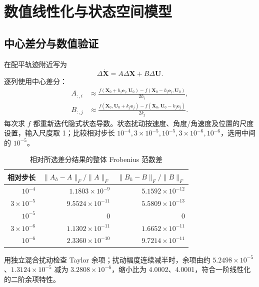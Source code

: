 \documentclass[UTF8,a4paper,11pt,fontset=windows]{ctexart}
\begin{document}
\section{数值线性化与状态空间模型}
\subsection{中心差分与数值验证}
在配平轨迹附近写为
\begin{equation}\label{eq:ss}
\Delta\dot{\bm X}=A\Delta\bm X+B\Delta\bm U.
\end{equation}
逐列使用中心差分：
\begin{align}
A_{:,i}&\approx\frac{f(\bm X_0+h_i\bm e_i,\bm U_0)-f(\bm X_0-h_i\bm e_i,\bm U_0)}{2h_i},\\
B_{:,j}&\approx\frac{f(\bm X_0,\bm U_0+k_j\bm e_j)-f(\bm X_0,\bm U_0-k_j\bm e_j)}{2k_j}.
\end{align}
每次求 $f$ 都重新迭代隐式状态导数。状态扰动按速度、角度/角速度及位置的尺度设置，输入尺度取 1；比较相对步长 $10^{-4},3\times10^{-5},10^{-5},3\times10^{-6},10^{-6}$，选用中间的 $10^{-5}$。

\begin{table}[H]\centering
\caption{相对所选差分结果的整体 Frobenius 范数差}
\begin{tabular}{rrr}\toprule
相对步长&$\|A_h-A\|_F/\|A\|_F$&$\|B_h-B\|_F/\|B\|_F$\\\midrule
$10^{-4}$&$1.1803\times10^{-9}$&$5.1592\times10^{-12}$\\
$3\times10^{-5}$&$9.5524\times10^{-11}$&$5.5809\times10^{-13}$\\
$10^{-5}$&$0$&$0$\\
$3\times10^{-6}$&$1.1302\times10^{-11}$&$1.6652\times10^{-11}$\\
$10^{-6}$&$2.3360\times10^{-10}$&$9.7214\times10^{-11}$\\\bottomrule
\end{tabular}
\end{table}
用独立混合扰动检查 Taylor 余项；扰动幅度连续减半时，余项由约 $5.2498\times10^{-5}$、$1.3124\times10^{-5}$ 减为 $3.2808\times10^{-6}$，缩小比为 4.0002、4.0001，符合一阶线性化的二阶余项特性。
\end{document}

